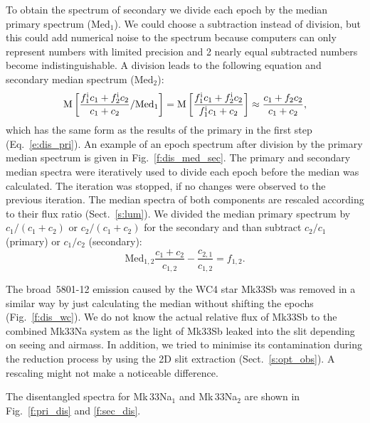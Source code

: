 \documentclass[fleqn,usenatbib]{mnras}
\begin{document}
To obtain the spectrum of secondary we divide each epoch by the median primary spectrum ($\mathrm{Med_1}$). We could choose a subtraction instead of division, but this could add numerical noise to the spectrum because computers can only represent numbers with limited precision and 2 nearly equal subtracted numbers become indistinguishable. A division leads to the following equation and secondary median spectrum ($\mathrm{Med_2}$):
\begin{equation}
\mathrm{M}\left[\frac{f^{\rm i}_1 c_1 + f^{\rm i}_2 c_2}{c_1 + c_2}/\mathrm{Med_1}\right] = \mathrm{M} \left[ \frac{f^{\rm i}_1 c_1 + f^{\rm i}_2 c_2}{f^{\rm i}_1c_1+c_2}\right] \approx \frac{c_1 + f_2 c_2}{c_1 + c_2},
\end{equation}
which has the same form as the results of the primary in the first step (Eq.~\ref{e:dis_pri}). An example of an epoch spectrum after division by the primary median spectrum is given in Fig.~\ref{f:dis_med_sec}. The primary and secondary median spectra were iteratively used to divide each epoch before the median was calculated. The iteration was stopped, if no changes were observed to the previous iteration. The median spectra of both components are rescaled according to their flux ratio (Sect.~\ref{s:lum}). We divided the median primary spectrum by $c_1/(c_1 +c_2)$ or $c_2/(c_1 +c_2)$ for the secondary and than subtract $c_2/c_1$ (primary) or $c_1/c_2$ (secondary):
\begin{equation}
\mathrm{Med}_{1,2} \frac{c_1 + c_2}{c_{1,2}} -\frac{c_{2,1}}{c_{1,2}} = f_{1,2}.
\end{equation}

The broad \,5801-12 emission caused by the WC4 star Mk33Sb was removed in a similar way by just calculating the median without shifting the epochs (Fig.~\ref{f:dis_wc}). We do not know the actual relative flux of Mk33Sb to the combined Mk33Na system as the light of Mk33Sb leaked into the slit depending on seeing and airmass. In addition, we tried to minimise its contamination during the reduction process by using the 2D slit extraction (Sect.~\ref{s:opt_obs}). A rescaling might not make a noticeable difference.
   
The disentangled spectra for Mk\,33Na$_1$ and Mk\,33Na$_2$ are shown in Fig.~\ref{f:pri_dis} and \ref{f:sec_dis}.
\end{document}
